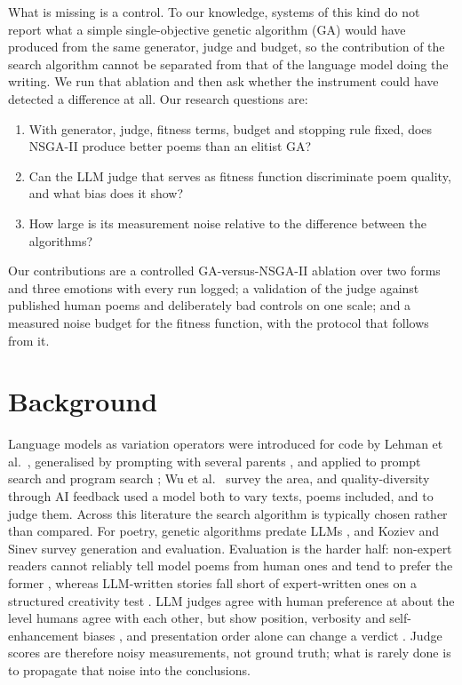 \documentclass[sigconf,nonacm]{acmart}
\begin{document}
What is missing is a control. To our knowledge, systems of this kind do not report what a simple single-objective genetic algorithm (GA) would have produced from the same generator, judge and budget, so the contribution of the search algorithm cannot be separated from that of the language model doing the writing. We run that ablation and then ask whether the instrument could have detected a difference at all. Our research questions are:
\begin{enumerate}
\item[\textbf{RQ1}] With generator, judge, fitness terms, budget and stopping rule fixed, does NSGA-II produce better poems than an elitist GA?
\item[\textbf{RQ2}] Can the LLM judge that serves as fitness function discriminate poem quality, and what bias does it show?
\item[\textbf{RQ3}] How large is its measurement noise relative to the difference between the algorithms?
\end{enumerate}
Our contributions are a controlled GA-versus-NSGA-II ablation over two forms and three emotions with every run logged; a validation of the judge against published human poems and deliberately bad controls on one scale; and a measured noise budget for the fitness function, with the protocol that follows from it.

\section{Background}
Language models as variation operators were introduced for code by Lehman et al.\ \cite{lehman2022}, generalised by prompting with several parents \cite{meyerson2024}, and applied to prompt search \cite{guo2024} and program search \cite{romera2024}; Wu et al.\ \cite{wu2025survey} survey the area, and quality-diversity through AI feedback \cite{bradley2024} used a model both to vary texts, poems included, and to judge them. Across this literature the search algorithm is typically chosen rather than compared. For poetry, genetic algorithms predate LLMs \cite{manurung2012}, and Koziev and Sinev \cite{koziev2026} survey generation and evaluation. Evaluation is the harder half: non-expert readers cannot reliably tell model poems from human ones and tend to prefer the former \cite{porter2024}, whereas LLM-written stories fall short of expert-written ones on a structured creativity test \cite{chakrabarty2024}. LLM judges agree with human preference at about the level humans agree with each other, but show position, verbosity and self-enhancement biases \cite{zheng2023}, and presentation order alone can change a verdict \cite{wang2024fair}. Judge scores are therefore noisy measurements, not ground truth; what is rarely done is to propagate that noise into the conclusions.
\end{document}
